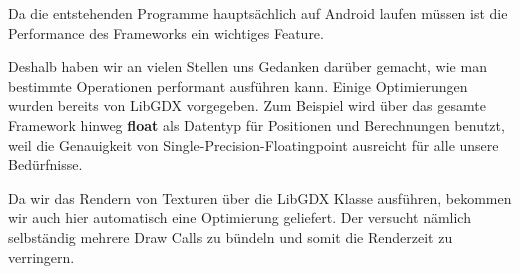 Da die entstehenden Programme hauptsächlich auf Android laufen müssen ist die Performance des Frameworks ein wichtiges Feature.

Deshalb haben wir an vielen Stellen uns Gedanken darüber gemacht, wie man bestimmte Operationen performant ausführen kann. Einige Optimierungen wurden bereits von LibGDX vorgegeben. Zum Beispiel wird über das gesamte Framework hinweg \textbf{float} als Datentyp für Positionen und Berechnungen benutzt, weil die Genauigkeit von Single-Precision-Floatingpoint ausreicht für alle unsere Bedürfnisse.

Da wir das Rendern von Texturen über die LibGDX Klasse  ausführen, bekommen wir auch hier automatisch eine Optimierung geliefert. Der  versucht nämlich selbständig mehrere Draw Calls zu bündeln und somit die Renderzeit zu verringern.

